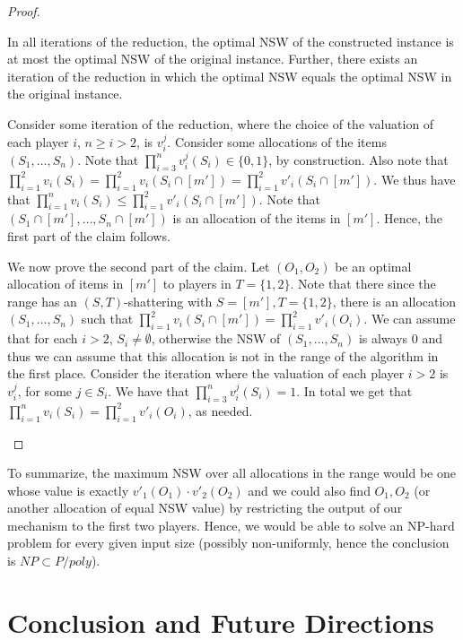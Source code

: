 \documentclass{article}
\begin{document}
\begin{proof}
\begin{claim*}
In all iterations of the reduction, the optimal NSW of the constructed instance is at most the optimal NSW of the original instance. Further, there exists an iteration of the reduction in which the optimal NSW equals the optimal NSW in the original instance. 
\end{claim*}
\begin{subproof}
Consider some iteration of the reduction, where the choice of the valuation of each player $i$, $n\geq i>2$, is $v_i^j$. Consider some allocations of the items $(S_1,\ldots, S_n)$. Note that $\prod_{i=3}^{n} v_i^j(S_i)\in \{0,1\}$, by construction. Also note that $\prod_{i=1}^{2} v_i(S_i)=\prod_{i=1}^{2} v_i(S_i\cap [m'])=\prod_{i=1}^{2} v'_i(S_i\cap [m'])$. We thus have that $\prod_{i=1}^{n} v_i(S_i) \leq \prod_{i=1}^{2} v'_i(S_i\cap [m'])$.  Note that $(S_1\cap [m'], \ldots, S_n \cap [m'])$ is an allocation of the items in $[m']$. Hence, the first part of the claim follows.

We now prove the second part of the claim. Let $(O_1,O_2)$ be an optimal allocation of items in $[m']$ to players in $T=\{1,2\}$. Note that there since the range has an $(S,T)$-shattering with $S = [m'], T=\{1,2\}$, there is an allocation $(S_1,\ldots, S_n)$ such that $\prod_{i=1}^{2} v_i(S_i \cap [m']) = \prod_{i=1}^{2}{v'_i}(O_i)$. We can assume that for each $i > 2$, $S_i \neq \emptyset$, otherwise the NSW of $(S_1,\ldots, S_n)$ is always $0$ and thus we can assume that this allocation is not in the range of the algorithm in the first place. Consider the iteration where the valuation of each player $i>2$ is $v_i^j$, for some $j \in S_i$. We have that $\prod_{i=3}^{n} v_i^j(S_i)=1$. In total we get that $\prod_{i=1}^{n} v_i(S_i) = \prod_{i=1}^{2} v'_i(O_i)$, as needed.
\end{subproof}
\end{proof}


To summarize, the maximum NSW over all allocations in the range would be one whose value is exactly $v'_1(O_1)\cdot  v'_2(O_2)$ and we could also find $O_1, O_2$ (or another allocation of equal NSW value) by restricting the output of our mechanism to the first two players. Hence, we would be able to solve an NP-hard problem for every given input size (possibly non-uniformly, hence the conclusion is $NP \subset P/poly$).







\section{Conclusion and Future Directions}
\end{document}
